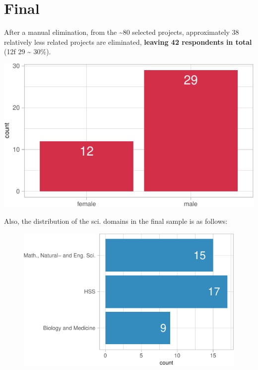 \documentclass[]{tufte-book}
\begin{document}
\hypertarget{final}{%
\section{Final}\label{final}}

After a manual elimination, from the \textasciitilde80 selected
projects, approximately 38 relatively less related projects are
eliminated, \textbf{leaving 42 respondents in total} (12f \textbar{} 29
\textasciitilde{} 30\%).

\includegraphics{15_interview_cand_2_files/figure-latex/gender-1}

Also, the distribution of the sci. domains in the final sample is as
follows:

\begin{figure}
\includegraphics{15_interview_cand_2_files/figure-latex/unnamed-chunk-2-1} \end{figure}


\end{document}
